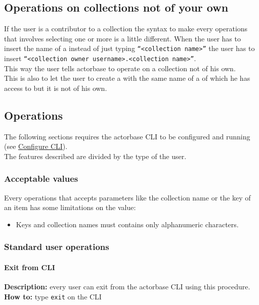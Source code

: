 \documentclass{scalatekids-article}
\begin{document}
\subsection{Operations on collections not of your own}
\label{sec:contributoroperations}
If the user is a contributor to a collection the syntax to make every operations that involves selecting one or more 
 is a little different. When the user has to insert the name of a  instead of 
just typing \texttt{``<collection name>''} the user has to insert \texttt{``<collection owner username>.<collection name>''}.\\This way the user tells actorbase to operate on a collection not of his own.\\This is also to let the user to 
create a  with the same name of a  of which he has access to but it is not of 
his own. 

\subsection{Operations}

The following sections requires the actorbase CLI to be configured and
running (see \hyperref[sec:configurationcli]{Configure CLI}).\\
The features described are divided by the type of the user.\\

\subsubsection{Acceptable values}
Every operations that accepts parameters like the collection name or the key of 
an item has some limitations on the value:
\begin{itemize}
  \item Keys and collection names must contains only alphanumeric characters.
\end{itemize}


\subsubsection{Standard user operations}
\label{sec:everyuser}
\paragraph{Exit from CLI}

\textbf{Description:} every user can exit from the actorbase CLI
using this procedure.\\
\textbf{How to:} type \texttt{exit} on the CLI
\end{document}
